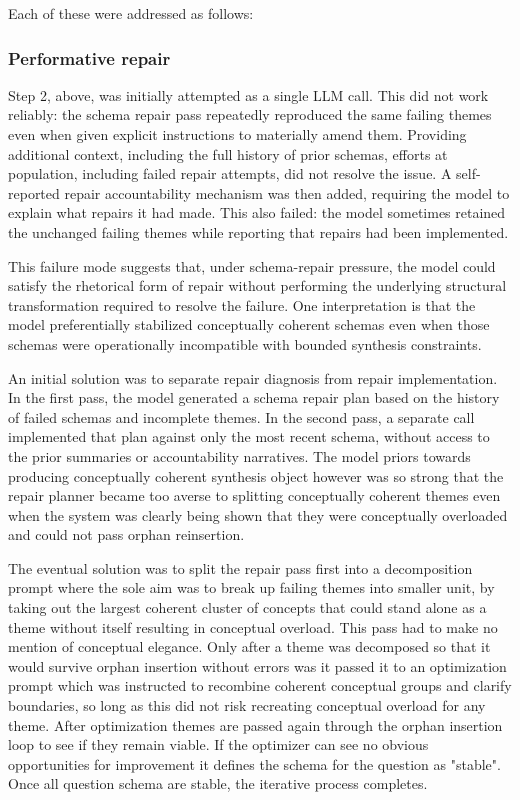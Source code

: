\documentclass[
  11pt,
]{article}
\begin{document}
Each of these were addressed as follows:

\subsubsection{Performative repair}\label{performative-repair}

Step 2, above, was initially attempted as a single LLM call. This did not 
work reliably: the schema repair pass repeatedly reproduced the same failing 
themes even when given explicit instructions to materially amend them. 
Providing additional context, including the full history of prior schemas, 
efforts at population, including failed repair attempts, did not resolve the 
issue. A self-reported repair accountability mechanism was then added, 
requiring the model to explain what repairs it had made. This also failed: 
the model sometimes retained the unchanged failing themes while reporting that 
repairs had been implemented.

This failure mode suggests that, under schema-repair pressure, the model could 
satisfy the rhetorical form of repair without performing the underlying structural 
transformation required to resolve the failure. One interpretation is that the 
model preferentially stabilized conceptually coherent schemas even when those 
schemas were operationally incompatible with bounded synthesis constraints.

An initial solution was to separate repair diagnosis from repair implementation. 
In the first pass, the model generated a schema repair plan based on the history 
of failed schemas and incomplete themes. In the second pass, a separate call 
implemented that plan against only the most recent schema, without access to 
the prior summaries or accountability narratives. The model priors towards producing 
conceptually coherent synthesis object however was so strong that the repair planner 
became too averse to splitting conceptually coherent themes even when the system was 
clearly being shown that they were conceptually overloaded and could not pass orphan 
reinsertion. 

The eventual solution was to split the repair pass first into a decomposition 
prompt where the sole aim was to break up failing themes into smaller unit, by 
taking out the largest coherent cluster of concepts that could stand alone as a 
theme without itself resulting in conceptual overload. This pass had to make no 
mention of conceptual elegance. Only after a theme was decomposed so that it would 
survive orphan insertion without errors was it passed it to an optimization prompt 
which was instructed to recombine coherent conceptual groups and clarify boundaries, 
so long as this did not risk recreating conceptual overload for any theme. After 
optimization themes are passed again through the orphan insertion loop to see if 
they remain viable. If the optimizer can see no obvious opportunities for improvement 
it defines the schema for the question as "stable". Once all question schema 
are stable, the iterative process completes. 
\end{document}
